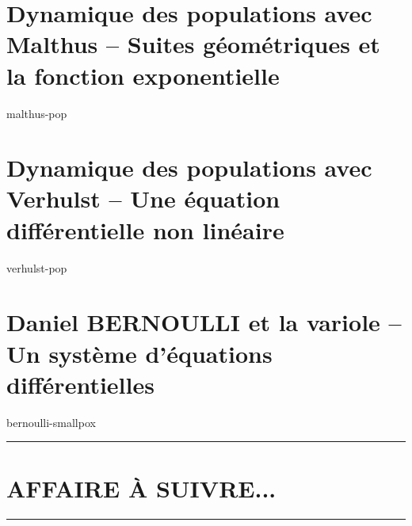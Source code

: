 \documentclass[12pt]{amsart}
\let\oldsection\section
\renewcommand\section[1]{\vfill\pagebreak\oldsection{#1}}
\begin{document}


\section{Dynamique des populations avec Malthus -- Suites géométriques et la fonction exponentielle}

{malthus-pop}




\section{Dynamique des populations avec Verhulst -- Une équation différentielle non linéaire}
\label{verhulst-model}

{verhulst-pop}




\section{Daniel BERNOULLI et la variole -- Un système d'équations différentielles}
\label{bernoulli-model}

{bernoulli-smallpox}




%



\bigskip

\hrule

\oldsection{AFFAIRE À SUIVRE...}

\bigskip

\hrule
\end{document}
